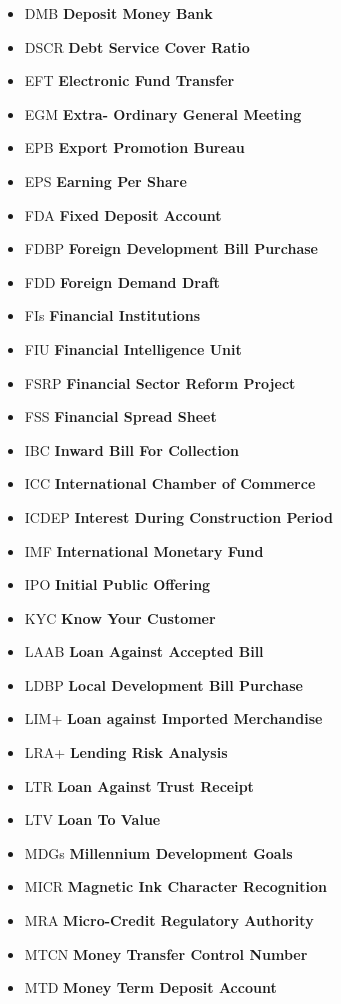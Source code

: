 \documentclass[11pt]{article}
\begin{document}
\begin{itemize}
\item DMB  \textbf{Deposit Money Bank}
\item DSCR  \textbf{Debt Service Cover Ratio}
\item EFT  \textbf{Electronic Fund Transfer}
\item EGM  \textbf{Extra- Ordinary General Meeting}
\item EPB  \textbf{Export Promotion Bureau}
\item EPS \textbf{Earning Per Share}
\item FDA  \textbf{Fixed Deposit Account}
\item FDBP  \textbf{Foreign Development Bill Purchase}
\item FDD  \textbf{Foreign Demand Draft}
\item FIs \textbf{Financial Institutions}
\item FIU  \textbf{Financial Intelligence Unit}
\item FSRP  \textbf{Financial Sector Reform Project}
\item FSS  \textbf{Financial Spread Sheet}
\item IBC  \textbf{Inward Bill For Collection}
\item ICC  \textbf{International Chamber of Commerce}
\item ICDEP  \textbf{Interest During Construction Period}
\item IMF \textbf{International Monetary Fund}
\item IPO  \textbf{Initial Public Offering}
\item KYC \textbf{Know Your Customer}
\item LAAB \textbf{Loan Against Accepted Bill}
\item LDBP \textbf{Local Development Bill Purchase}
\item LIM+ \textbf{Loan against Imported Merchandise}
\item LRA+ \textbf{Lending Risk Analysis}
\item LTR  \textbf{Loan Against Trust Receipt}
\item LTV \textbf{Loan To Value}
\item MDGs \textbf{Millennium Development Goals}
\item MICR  \textbf{Magnetic Ink Character Recognition}
\item MRA \textbf{Micro-Credit Regulatory Authority}
\item MTCN  \textbf{Money Transfer Control Number}
\item MTD  \textbf{Money Term Deposit Account}

\end{itemize}
\end{document}
